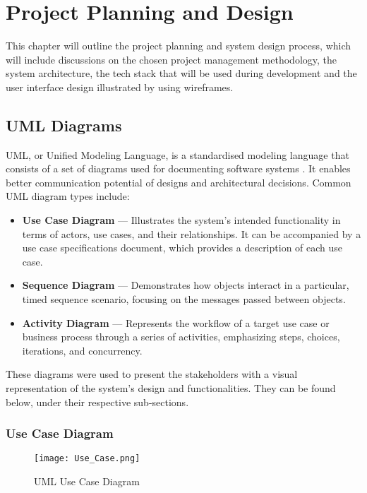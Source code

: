 \chapter{Project Planning and Design}

This chapter will outline the project planning and system design process, which will include discussions on the chosen project management methodology, the system architecture, the tech stack that will be used during development and the user interface design illustrated by using wireframes.

\section{UML Diagrams}

UML, or Unified Modeling Language, is a standardised modeling language that consists of a set of diagrams used for documenting software systems \parencite{uml}. It enables better communication potential of designs and architectural decisions. Common UML diagram types include:

\begin{itemize}
    \item \textbf{Use Case Diagram} --- Illustrates the system's intended functionality in terms of actors, use cases, and their relationships. It can be accompanied by a use case specifications document, which provides a description of each use case.
    \item \textbf{Sequence Diagram} --- Demonstrates how objects interact in a particular, timed sequence scenario, focusing on the messages passed between objects.
    \item \textbf{Activity Diagram} --- Represents the workflow of a target use case or business process through a series of activities, emphasizing steps, choices, iterations, and concurrency.
\end{itemize}

These diagrams were used to present the stakeholders with a visual representation of the system's design and functionalities. They can be found below, under their respective sub-sections.

\clearpage

\subsection{Use Case Diagram}
\begin{figure}[htbp]
    \centering
    \texttt{[image: Use\_Case.png]}
    \caption{UML Use Case Diagram}\label{fig:uml_usecase}
\end{figure}

